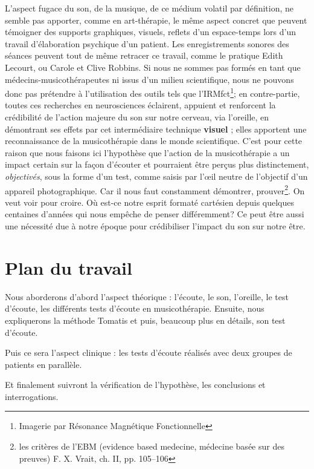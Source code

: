   
L'aspect fugace du son, de la musique, de ce médium volatil par
définition, ne semble pas apporter, comme en art-thérapie, le
même aspect concret que peuvent témoigner des supports graphiques,
visuels, reflets d'un espace-temps lors d'un travail d'élaboration
psychique d'un patient. Les enregistrements sonores des séances peuvent tout de 
même retracer ce travail, comme le pratique Edith Lecourt, ou Carole et Clive 
Robbins.
Si nous ne sommes pas formés en tant que médecins-musicothérapeutes ni issus 
d'un milieu scientifique, nous ne pouvons donc  pas prétendre à l'utilisation 
des outils
 tels que l'IRMfct\footnote{Imagerie par Résonance Magnétique Fonctionnelle}; 
en contre-partie, toutes ces recherches en
neurosciences éclairent, appuient et renforcent la crédibilité de l'action
majeure du son sur notre cerveau, via l'oreille, en démontrant ses effets par cet intermédiaire technique \textbf{visuel} ; elles apportent une 
reconnaissance de la musicothérapie dans le monde scientifique. C'est pour 
cette raison que nous  faisons ici l'hypothèse que l'action de la 
musicothérapie a un impact certain sur la façon d'écouter et pourraient être 
perçus plus
distinctement, \textsl{objectivés}, sous la forme d'un test, comme saisis par 
l'\oe il neutre de l'objectif d'un appareil
photographique.
Car il nous faut constamment démontrer, prouver\footnote{
	les critères de l'EBM (evidence based medecine, médecine basée sur des 
preuves) F. X. Vrait, ch. II, pp. 105--106 }. On veut voir pour croire. Où est-ce 
notre esprit formaté cartésien depuis quelques centaines d'années qui nous 
empêche de penser différemment? 
Ce peut être aussi une nécessité due à notre époque pour crédibiliser l'impact 
du son sur notre être. 


\section{Plan du travail}

Nous aborderons d'abord l'aspect théorique : l'écoute, le son, l'oreille, le 
test d'écoute, les différents tests d'écoute en musicothérapie.  Ensuite, nous 
expliquerons  la méthode Tomatis
et puis, beaucoup plus en détails,  son test d'écoute.

Puis ce sera l'aspect clinique : les tests d'écoute réalisés  avec deux groupes 
de patients en parallèle.

Et finalement suivront la vérification de l'hypothèse, les conclusions et 
interrogations. 
